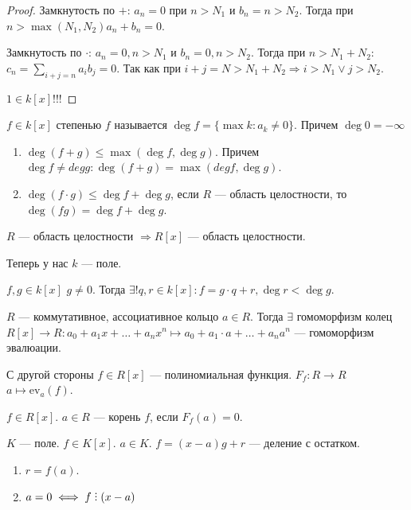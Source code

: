\begin{proof}
    Замкнутость по $+$:  $a_n = 0$ при  $n > N_1$ и  $b_n = n> N_2$. Тогда при $n > \max(N_1, N_2) a_n+b_n = 0$.

    Замкнутость по $\cdot$:  $a_n = 0, n > N_1$ и $b_n = 0, n > N_2$. Тогда при  $n > N_1+N_2:$ $c_n = \sum_{i+j=n} a_ib_j = 0$. Так как при  $i + j = N > N_1+N_2 \Rightarrow i > N_1 \lor j > N_2$.

    $1 \in k[x]$!!!
\end{proof}
\begin{definition}
    $f \in k[x]$ степенью  $f$ называется  $\deg f = \{\max k: a_k \neq 0\}$. Причем $\deg 0 = -\infty$
\end{definition}
\begin{properties}
    \slashn
    \begin{enumerate}
        \item $\deg (f+g) \le \max(\deg f, \deg g)$. Причем $\deg f \neq deg g: \deg(f+g) = \max(deg f, \deg g)$. 
        \item $\deg(f\cdot g) \le \deg f + \deg g$, если $R$ --- область целостности, то  $\deg (fg) = \deg f + \deg g$.
    \end{enumerate}
\end{properties}
\begin{consequence}
    $R$ --- область целостности  $\Rightarrow R[x]$ --- область целостности.
\end{consequence}
\slashn
Теперь у нас $k$ --- поле.
\begin{theorem}
    $f, g \in k[x]$ $g \neq 0$. Тогда  $\exists! q, r \in k[x]: f = g\cdot q + r, \deg r < \deg g$.
\end{theorem}
\begin{consequence}
    $R$ --- коммутативное, ассоциативное кольцо  $a \in R$. Тогда $\exists$ гомоморфизм колец  $R[x] \to R: a_0 + a_1 x + \ldots + a_n x^n \mapsto a_0 + a_1 \cdot a + \ldots + a_n a^n$ --- гомоморфизм эвалюации. 

    С другой стороны $f \in R[x]$ --- полиномиальная функция.  $F_f: R \to R$  $a \mapsto \text{ev}_a(f)$.
\end{consequence}
\begin{definition}
    $f \in R[x]$.  $a\in R$ --- корень  $f$, если  $F_f(a) = 0$.
\end{definition}
\begin{theorem}[Безу]
    $K$ --- поле.  $f \in K[x]$. $a \in K$. $f = (x-a)g + r$ --- деление с остатком.
    \begin{enumerate}
        \item $r = f(a)$.
        \item  $a = 0 \iff f \divby (x-a)$
    \end{enumerate}
\end{theorem}

